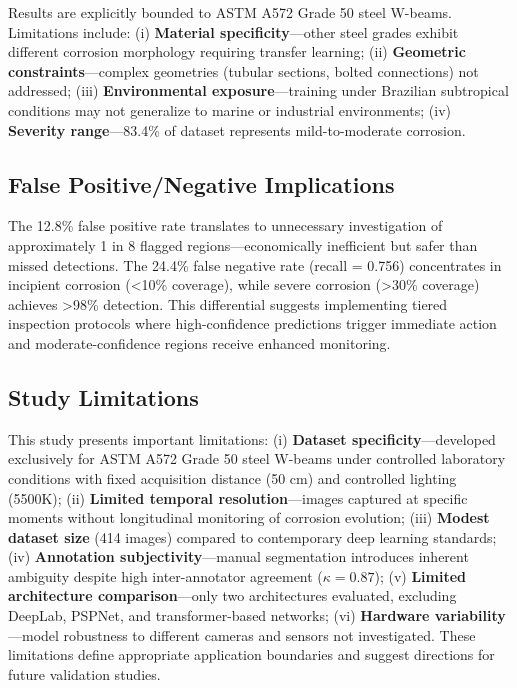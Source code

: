 \documentclass[Journal,letterpaper]{ascelike-new}
\begin{document}
Results are explicitly bounded to ASTM A572 Grade 50 steel W-beams. Limitations include: (i) \textbf{Material specificity}---other steel grades exhibit different corrosion morphology requiring transfer learning; (ii) \textbf{Geometric constraints}---complex geometries (tubular sections, bolted connections) not addressed; (iii) \textbf{Environmental exposure}---training under Brazilian subtropical conditions may not generalize to marine or industrial environments; (iv) \textbf{Severity range}---83.4\% of dataset represents mild-to-moderate corrosion.

\subsection{False Positive/Negative Implications}
\label{subsec:fp_fn_implications}

The 12.8\% false positive rate translates to unnecessary investigation of approximately 1 in 8 flagged regions---economically inefficient but safer than missed detections. The 24.4\% false negative rate (recall = 0.756) concentrates in incipient corrosion (<10\% coverage), while severe corrosion (>30\% coverage) achieves >98\% detection. This differential suggests implementing tiered inspection protocols where high-confidence predictions trigger immediate action and moderate-confidence regions receive enhanced monitoring.

\subsection{Study Limitations}
\label{subsec:limitations}

This study presents important limitations: (i) \textbf{Dataset specificity}---developed exclusively for ASTM A572 Grade 50 steel W-beams under controlled laboratory conditions with fixed acquisition distance (50 cm) and controlled lighting (5500K); (ii) \textbf{Limited temporal resolution}---images captured at specific moments without longitudinal monitoring of corrosion evolution; (iii) \textbf{Modest dataset size} (414 images) compared to contemporary deep learning standards; (iv) \textbf{Annotation subjectivity}---manual segmentation introduces inherent ambiguity despite high inter-annotator agreement ($\kappa = 0.87$); (v) \textbf{Limited architecture comparison}---only two architectures evaluated, excluding DeepLab, PSPNet, and transformer-based networks; (vi) \textbf{Hardware variability}---model robustness to different cameras and sensors not investigated. These limitations define appropriate application boundaries and suggest directions for future validation studies.
\end{document}
